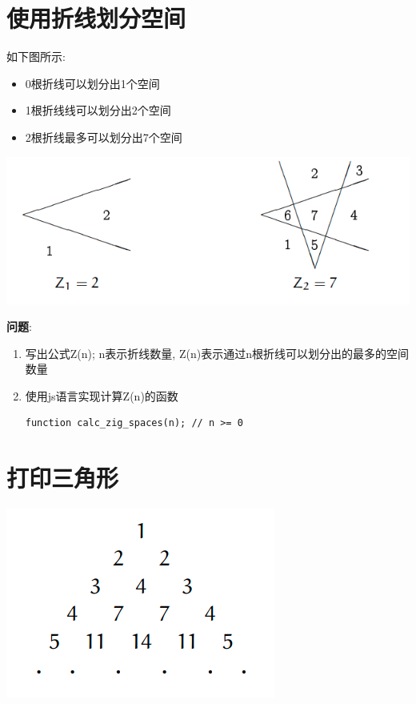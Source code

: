 \documentclass[11pt]{article}
\begin{document}
\section{使用折线划分空间}
\label{sec:org3c23450}

如下图所示:
\begin{itemize}
\item 0根折线可以划分出1个空间
\item 1根折线线可以划分出2个空间
\item 2根折线最多可以划分出7个空间
\end{itemize}

\begin{center}
\includegraphics[width=.9\linewidth]{./img/zline.png}
\end{center}


\textbf{问题}:

\begin{enumerate}
\item 写出公式Z(n); n表示折线数量, Z(n)表示通过n根折线可以划分出的最多的空间数量
\item 使用js语言实现计算Z(n)的函数
\begin{verbatim}
function calc_zig_spaces(n); // n >= 0
\end{verbatim}
\end{enumerate}

\section{打印三角形}
\label{sec:orgf183a24}
\begin{center}
\includegraphics[width=.9\linewidth]{./img/triangle.png}
\end{center}
\end{document}
